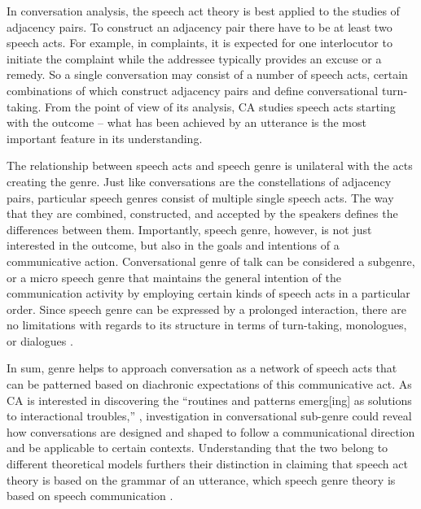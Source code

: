 \documentclass[12pt]{article}
\begin{document}
In conversation analysis, the speech act theory is best applied to the studies of adjacency pairs. To construct an adjacency pair there have to be at least two speech acts. For example, in complaints, it is expected for one interlocutor to initiate the complaint while the addressee typically provides an excuse or a remedy. So a single conversation may consist of a number of speech acts, certain combinations of which construct adjacency pairs and define conversational turn-taking. From the point of view of its analysis, CA studies speech acts starting with the outcome -- what has been achieved by an utterance is the most important feature in its understanding.

The relationship between speech acts and speech genre is unilateral with the acts creating the genre. Just like conversations are the constellations of adjacency pairs, particular speech genres consist of multiple single speech acts. The way that they are combined, constructed, and accepted by the speakers defines the differences between them. Importantly, speech genre, however, is not just interested in the outcome, but also in the goals and intentions of a communicative action. Conversational genre of talk can be considered a subgenre, or a micro speech genre that maintains the general intention of the communication activity by employing certain kinds of speech acts in a particular order. Since speech genre can be expressed by a prolonged interaction, there are no limitations with regards to its structure in terms of turn-taking, monologues, or dialogues \parencite{komleva2011}.

In sum, genre helps to approach conversation as a network of speech acts that can be patterned based on diachronic expectations of this communicative act. As CA is interested in discovering the ``routines and patterns emerg[ing] as solutions to interactional troubles,'' \parencite[p. 138]{aakhus2004}, investigation in conversational sub-genre could reveal how conversations are designed and shaped to follow a communicational direction and be applicable to certain contexts. Understanding that the two belong to different theoretical models furthers their distinction in claiming that speech act theory is based on the grammar of an utterance, which speech genre theory is based on speech communication \parencite{komleva2011}. 
\end{document}
